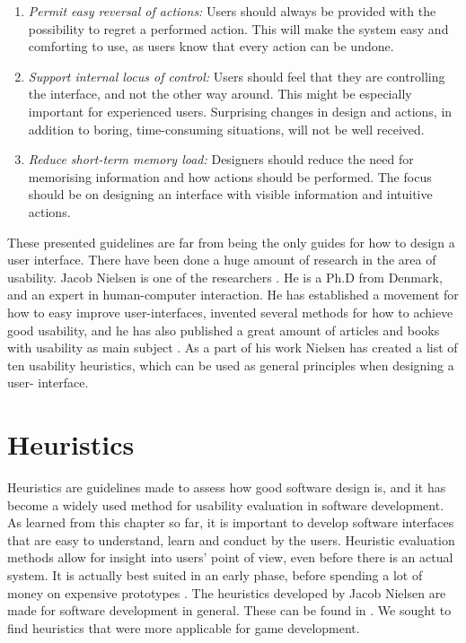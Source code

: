 \begin{enumerate}[{e}.1]
\item \emph{Permit easy reversal of actions:} Users should always be provided with the possibility to regret a performed action. This will make the system easy and comforting to use, as users know that every action can be undone. 
\item \emph{Support internal locus of control:} Users should feel that they are controlling the interface, and not the other way around. This might be especially important for experienced users. Surprising changes in design and actions, in addition to boring, time-consuming situations, will not be well received. 
\item \emph{Reduce short-term memory load:} Designers should reduce the need for memorising information and how actions should be performed. The focus should be on designing an interface with visible information and intuitive actions.
\end{enumerate}

These presented guidelines are far from being the only guides for how to design a user interface. There have been done a huge amount of research in the area of usability. Jacob Nielsen is one of the researchers \cite{nielsen2005ten}. He is a Ph.D from Denmark, and an expert in human-computer interaction. He has established a movement for how to easy improve user-interfaces, invented several methods for how to achieve good usability, and he has also published a great amount of articles and books with usability as main subject \cite{JNielsen}. As a part of his work Nielsen has created a list of ten usability heuristics, which can be used as general principles when designing a user- interface\cite{nielsen2005ten}. 

\section{Heuristics}
\label{sec:heur}
Heuristics are guidelines made to assess how good software design is, and it has become a widely used method for usability evaluation in software development. As learned from this chapter so far, it is important to develop software interfaces that are easy to understand, learn and conduct by the users. Heuristic evaluation methods allow for insight into users' point of view, even before there is an actual system. It is actually best suited in an early phase, before spending a lot of money on expensive prototypes \cite{desurvire}. The heuristics developed by Jacob Nielsen are made for software development in general. These can be found in \cite{nielsen2005ten}. We sought to find heuristics that were more applicable for game development. 

